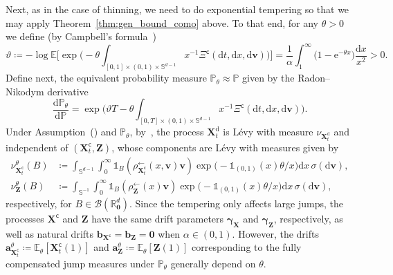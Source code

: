 \documentclass[en,oneside,bbfont,article]{amsart}
\theoremstyle{remark}
\theoremstyle{definition}
\theoremstyle{definition}
\newcommand\Sp{\mathbb{S}}
\newcommand\R{\mathbb{R}}
\newcommand\E{\mathds{E}}
\newcommand\e{\mathord{\mathrm{e}}}
\newcommand\p{\mathds{P}}
\newcommand\1{\mathds{1}}
\newcommand\la{\leftarrow}
\newcommand\co{\mathsf{c}}
\newcommand{\D}{\mathrm{d}}
\begin{document}
Next, as in the case of thinning, we need to do exponential tempering so that we may apply Theorem~\ref{thm:gen_bound_como} above. To that end, for any $\theta>0$ we define (by Campbell's formula~\cite[p.~28]{MR1207584})
\begin{equation}\label{eq:vartheta_defn_cm}
\vartheta \coloneqq -\log \E \bigg[\exp\bigg(-\theta\int_{[0,1]\times (0,1)\times \Sp^{d-1}} x^{-1} 
    \Xi^\co(\D t,\D x,\D\bm{v}) \bigg)\bigg]= \frac{1}{\alpha}\int_1^\infty \big(1-\e^{-\theta x} \big)  \frac{\D x}{x^2}>0. %
\end{equation}
Define next, the equivalent probability measure $\p_\theta\approx \p$ given by the Radon--Nikodym derivative
\begin{equation}
\label{eq:P_theta^t_cm}  
\frac{\D\p_\theta}{\D\p}=\exp\bigg(\vartheta T-\theta\int_{[0,T]\times (0,1)\times \Sp^{d-1}} x^{-1} \Xi^\co(\D t, \D x,\D\bm{v})\bigg).
\end{equation}
Under Assumption~() and $\p_\theta$, by~\cite[Thm~33.1]{MR3185174}, the process $\bm{X}^\D_t$ is L\'evy with measure $\nu_{\bm{X}_t^\D}$ and independent of $(\bm{X}^\co_t,\bm{Z})$, whose components are L\'evy with measures given by 
\begin{align*}
\nu_{\bm{X}_t^\co}^\theta(B)
&\coloneqq %
\int_{\Sp^{d-1}}\int_0^\infty \1_{B}(\rho^{\la}_{\bm{X}_t^\co}(x,\bm{v})\bm{v}) \exp\big(-\1_{(0,1)}(x)\theta /x\big) \D x\, \sigma(\D\bm{v}),\\
\nu_{\bm{Z}}^\theta(B)
&\coloneqq \int_{\Sp^{-1}} \int_0^\infty \1_{B}(\rho^{\la}_{\bm{Z}}(x)\bm{v}) \exp\big(-\1_{(0,1)}(x)\theta /x\big)  %
\D x\,%
\sigma(\D \bm{v}),
\end{align*}
respectively, for $B\in \mathcal{B}(\R^d_{\bm{0}})$. Since the tempering only affects large jumps, the processes $\bm{X}^\co$ and $\bm{Z}$ have the same drift parameters $\bm{\gamma}_{\bm{X}}$ and $\bm{\gamma}_{\bm{Z}}$, respectively, as well as natural drifts $\bm{b}_{\bm{X}^\co}=\bm{b}_{\bm{Z}}=\bm{0}$ when $\alpha\in(0,1)$. However, the drifts $\bm{a}_{\bm{X}_t^\co}^\theta\coloneqq\E_\theta[\bm{X}_t^\co(1)]$ and $\bm{a}_{\bm{Z}}^\theta\coloneqq\E_\theta[\bm{Z}(1)]$ corresponding to the fully compensated jump measures under $\p_\theta$ generally depend on $\theta$. 
\end{document}
